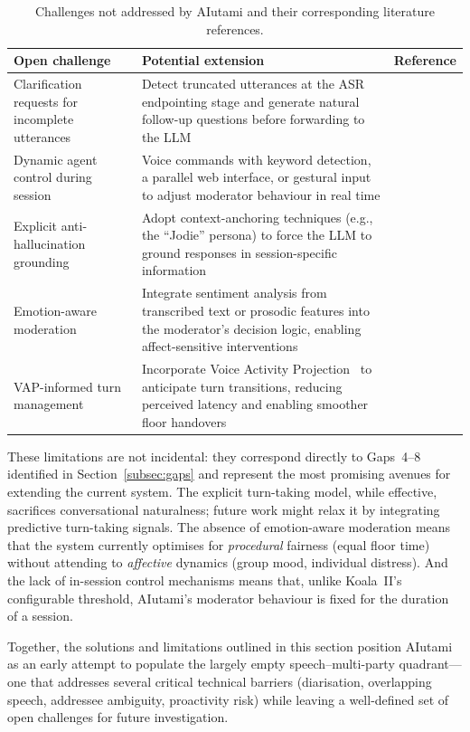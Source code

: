 \begin{table}[ht]
  \centering
  \caption{Challenges not addressed by AIutami and their corresponding
    literature references.}
  \label{tab:aiutami-limitations}
  \small
  \begin{tabularx}{\textwidth}{@{} l X l @{}}
    \toprule
    \textbf{Open challenge} & \textbf{Potential extension} & \textbf{Reference} \\
    \midrule
    Clarification requests for incomplete utterances
      & Detect truncated utterances at the ASR endpointing stage and generate
        natural follow-up questions before forwarding to the LLM
      & \cite{addlesee2024ari} \\
    \addlinespace
    Dynamic agent control during session
      & Voice commands with keyword detection, a parallel web interface, or
        gestural input to adjust moderator behaviour in real time
      & \cite{houde2025koala} \\
    \addlinespace
    Explicit anti-hallucination grounding
      & Adopt context-anchoring techniques (e.g., the ``Jodie'' persona) to
        force the LLM to ground responses in session-specific information
      & \cite{addlesee2024ari} \\
    \addlinespace
    Emotion-aware moderation
      & Integrate sentiment analysis from transcribed text or prosodic features
        into the moderator's decision logic, enabling affect-sensitive
        interventions
      & \cite{adikari2022empathic} \\
    \addlinespace
    VAP-informed turn management
      & Incorporate Voice Activity Projection~\cite{ekstedt2022vap} to
        anticipate turn transitions, reducing perceived latency and enabling
        smoother floor handovers
      & \cite{ekstedt2022vap} \\
    \bottomrule
  \end{tabularx}
\end{table}

These limitations are not incidental: they correspond directly to
Gaps~4--8 identified in Section~\ref{subsec:gaps} and represent the most
promising avenues for extending the current system.  The explicit turn-taking
model, while effective, sacrifices conversational naturalness; future work might
relax it by integrating predictive turn-taking signals.  The absence of
emotion-aware moderation means that the system currently optimises for
\emph{procedural} fairness (equal floor time) without attending to
\emph{affective} dynamics (group mood, individual distress).  And the lack of
in-session control mechanisms means that, unlike Koala~II's configurable
threshold, AIutami's moderator behaviour is fixed for the duration of a
session.

Together, the solutions and limitations outlined in this section position
AIutami as an early attempt to populate the largely empty
speech--multi-party quadrant---one that addresses several critical technical
barriers (diarisation, overlapping speech, addressee ambiguity, proactivity
risk) while leaving a well-defined set of open challenges for future
investigation.
